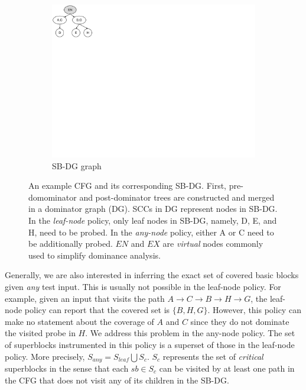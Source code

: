 {\begin{figure}[t!]
    \hspace{0.5cm}
    \begin{subfigure}[t]{0.15\textwidth}
        \includegraphics[clip, trim=0.1cm 12.6cm 20.4cm 0.1cm, width=\textwidth]{fig/bcov-03-sbgraph}
        
        \caption{\small SB-DG graph}
        \label{fig:3:sbgraph}
    \end{subfigure}
    
    \caption{An example CFG and its corresponding SB-DG.
        First, pre-domominator and post-dominator trees are constructed and merged in a dominator graph (DG). 
        SCCs in DG represent nodes in SB-DG.
        In the \textit{leaf-node} policy, only leaf nodes in SB-DG, namely, D, E, and H, need to be probed. 
        In the \textit{any-node} policy, either A or C need to be additionally probed.
        $EN$ and $EX$ are \textit{virtual} nodes commonly used to simplify dominance analysis.        
    }
    \label{fig:probe-pruning}
\end{figure}

Generally, we are also interested in inferring the exact set of covered basic blocks given \textit{any} test input.
This is usually not possible in the leaf-node policy. 
For example, given an input that visits the path $A \rightarrow C \rightarrow B \rightarrow H \rightarrow G$, 
the leaf-node policy can report that the covered set is $\{B,H,G\}$. 
However, this policy can make no statement about the coverage of $A$ and $C$ since they do not dominate the visited probe in $H$.
We address this problem in the any-node policy.
The set of superblocks instrumented in this policy is a superset of those in the leaf-node policy.
More precisely, \mbox{$S_{any}=S_{leaf} \bigcup S_{c}$}.\linebreak
$S_c$ represents the set of \textit{critical} superblocks in the sense that each $sb \in S_c$ can be visited by at least one path in the CFG that does not visit any of its children in the SB-DG.

}
